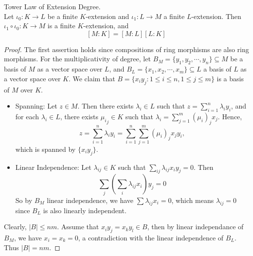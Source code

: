 \documentclass[../book.tex]{subfiles}
\begin{document}
\begin{thm} Tower Law of Extension Degree. \\
Let $\iota_0 : K \to L$ be a finite $K$-extension and 
$\iota_1 : L \to M$ a finite $L$-extension.
Then $\iota_1 \circ \iota_0 : K \to M$ is a finite $K$-extension, and 
\[
    [M : K]=[M : L][L : K]
\]
\end{thm}
\begin{proof}
The first assertion holds since compositions 
of ring morphisms are also ring morphisms. 
For the multiplicativity of degree, 
let $B_M=\{y_1,y_2,\cdots,y_n\} \subseteq M$ be a basis of $M$ 
as a vector space over $L$, 
and $B_L=\{x_1,x_2,\cdots,x_m\} \subseteq L$ a basis of $L$ 
as a vector space over $K$.
We claim that $B = \{x_iy_j:1 \leq i \leq n, 1\leq j \leq m\}$ 
is a basis of $M$ over $K$.

\begin{itemize}
    \item Spanning: 
        Let $z \in M$. 
        Then there exists $\lambda_i \in L$ such that 
        $z=\displaystyle\sum_{i=1}^{n} \lambda_iy_i$, 
        and for each $\lambda_i \in L$, there exists ${\mu_i}_j \in K$ 
        such that $\lambda_i=\displaystyle\sum_{j=1}^{m} {(\mu_i)}_j x_j$. 
        Hence,\[
            z = \sum_{i=1}^{n} \lambda_iy_i = 
            \sum_{i=1}^{n} \sum_{j=1}^{m} {(\mu_i)}_j x_j y_i,
        \]
        which is spanned by $\{x_iy_j\}$.
    \item Linear Independence: 
        Let $\lambda_{ij} \in K$ such that 
        $\displaystyle\sum_{ij}\lambda_{ij} x_iy_j=0$. 
        Then \[\sum_j(\sum_i \lambda_{ij} x_i)y_j=0\]
        So by $B_M$ linear independence, 
        we have $\sum \lambda_{ij}x_i=0$, 
        which means $\lambda_{ij}=0$ 
        since $B_L$ is also linearly independent.
\end{itemize}
Clearly, $|B| \leq nm$. Assume that $x_i y_j = x_k y_l \in B$, 
then by linear independance of $B_M$, 
we have $x_i = x_k = 0$, a contradiction with the linear independence of $B_L$. 
Thus $|B| = nm$.
\end{proof}
\end{document}
